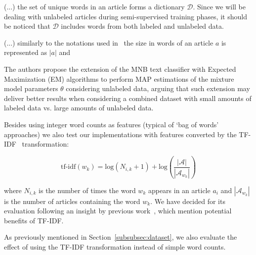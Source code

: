 (...) the set of unique words in an article forms a dictionary $\mathcal{D}$. 
Since we will be dealing with unlabeled articles during semi-supervised 
training phases, it should be noticed that $\mathcal{D}$ includes words from 
both labeled and unlabeled data.\vertbreak


(...) similarly to the notations used in~\cite{Nigam2000,Su2011} the size in 
words of an article $a$ is represented as $|a|$ and 


The authors propose the extension of the MNB text 
classifier with Expected 
Maximization (EM) algorithms to perform MAP estimations of the mixture model 
parameters $\theta$ considering unlabeled data, 
arguing that such extension may deliver better results when considering a 
combined dataset with small amounts of labeled 
data vs. large amounts of unlabeled data.\vertbreak

Besides using integer word counts as features (typical of `bag of words' 
approaches) we also test our implementations with features converted by the 
TF-IDF~\cite{Rennie03tacklingthe} transformation:

\begin{equation}
    \text{tf-idf}(w_k) = \text{log}(N_{i,k} + 1) + \text{log}(\frac{|\mathcal{A}|}{|\mathcal{A}_{w_k}|})
    \label{eq:tf-idf}
\end{equation}

where $N_{i,k}$ is the number of times the word $w_k$ appears in an article 
$a_i$ and $|\mathcal{A}_{w_k}|$ is the number of articles containing the word 
$w_k$. We have decided for its evaluation following an insight by 
previous work~\cite{Rennie03tacklingthe,Kibriya:2004:MNB:2146834.2146882}, 
which mention potential benefits of TF-IDF.

 As 
previously mentioned in Section~\ref{subsubsec:dataset}, we also evaluate the 
effect of using the TF-IDF transformation instead of simple word counts.
